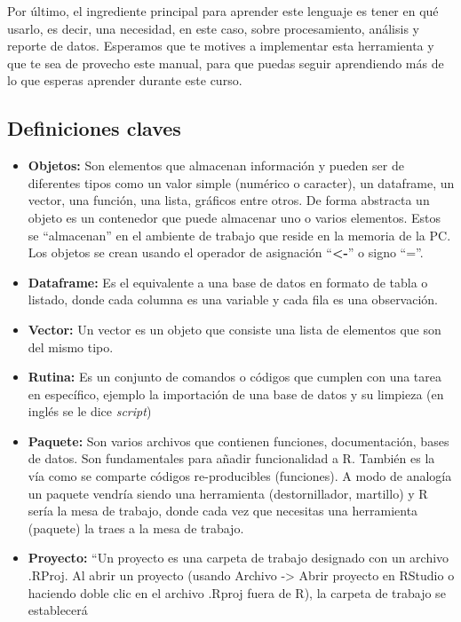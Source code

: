 \documentclass[
  letterpaper,
  DIV=11,
  numbers=noendperiod]{scrreprt}
\begin{document}
Por último, el ingrediente principal para aprender este lenguaje es
tener en qué usarlo, es decir, una necesidad, en este caso, sobre
procesamiento, análisis y reporte de datos. Esperamos que te motives a
implementar esta herramienta y que te sea de provecho este manual, para
que puedas seguir aprendiendo más de lo que esperas aprender durante
este curso.

\subsection{Definiciones claves}\label{definiciones-claves}

\begin{itemize}
\item
  \textbf{Objetos:} Son elementos que almacenan información y pueden ser
  de diferentes tipos como un valor simple (numérico o caracter), un
  dataframe, un vector, una función, una lista, gráficos entre otros. De
  forma abstracta un objeto es un contenedor que puede almacenar uno o
  varios elementos. Estos se ``almacenan'' en el ambiente de trabajo que
  reside en la memoria de la PC. Los objetos se crean usando el operador
  de asignación ``\textbf{\textless-}'' o signo ``=''.
\item
  \textbf{Dataframe:} Es el equivalente a una base de datos en formato
  de tabla o listado, donde cada columna es una variable y cada fila es
  una observación.
\item
  \textbf{Vector:} Un vector es un objeto que consiste una lista de
  elementos que son del mismo tipo.
\item
  \textbf{Rutina:} Es un conjunto de comandos o códigos que cumplen con
  una tarea en específico, ejemplo la importación de una base de datos y
  su limpieza (en inglés se le dice \emph{script})
\item
  \textbf{Paquete:} Son varios archivos que contienen funciones,
  documentación, bases de datos. Son fundamentales para añadir
  funcionalidad a R. También es la vía como se comparte códigos
  re-producibles (funciones). A modo de analogía un paquete vendría
  siendo una herramienta (destornillador, martillo) y R sería la mesa de
  trabajo, donde cada vez que necesitas una herramienta (paquete) la
  traes a la mesa de trabajo.
\item
  \textbf{Proyecto:} ``Un proyecto es una carpeta de trabajo designado
  con un archivo .RProj. Al abrir un proyecto (usando Archivo
  -\textgreater{} Abrir proyecto en RStudio o haciendo doble clic en el
  archivo .Rproj fuera de R), la carpeta de trabajo se establecerá

\end{itemize}
\end{document}
